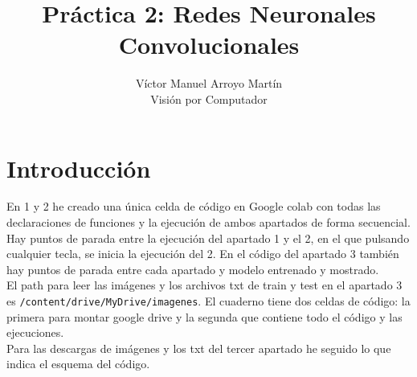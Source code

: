 \documentclass[12pt]{article}
\date{}
\begin{document}
 
\title{Práctica 2: Redes Neuronales Convolucionales}
\author{Víctor Manuel Arroyo Martín\\ %
Visión por Computador}

\maketitle
\section*{Introducción}
En 1 y 2 he creado una única celda de código en Google colab con todas las declaraciones de funciones y la ejecución de ambos apartados de forma secuencial.\\
Hay puntos de parada entre la ejecución del apartado 1 y el 2, en el que pulsando cualquier tecla, se inicia la ejecución del 2. En el código del apartado 3 también hay puntos de parada entre cada apartado y modelo entrenado y mostrado.\\
El path para leer las imágenes y los archivos txt de train y test en el apartado 3 es \texttt{/content/drive/MyDrive/imagenes}. El cuaderno tiene dos celdas de código: la primera para montar google drive y la segunda que contiene todo el código y las ejecuciones.\\
Para las descargas de imágenes y los txt del tercer apartado he seguido lo que indica el esquema del código.
\end{document}
